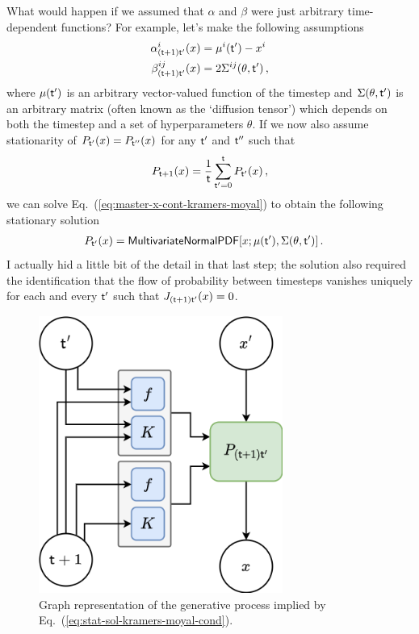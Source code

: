 \documentclass{book}
\begin{document}
What would happen if we assumed that $\alpha$ and $\beta$ were just arbitrary time-dependent functions? For example, let's make the following assumptions
\begin{align}
\alpha^i_{({\sf t}+1){\sf t}'}(x) &= \mu^i({\sf t}')-x^i \\
\beta^{ij}_{({\sf t}+1){\sf t}'}(x) &= 2\Sigma^{ij}(\theta, {\sf t}') \,,
\end{align}
where $\mu ({\sf t}')$ is an arbitrary vector-valued function of the timestep and $\Sigma (\theta ,{\sf t}')$ is an arbitrary matrix (often known as the `diffusion tensor') which depends on both the timestep and a set of hyperparameters $\theta$. If we now also assume stationarity of $P_{{\sf t}'}(x)=P_{{\sf t}''}(x)$ for any ${\sf t}'$ and ${\sf t}''$ such that
\begin{align}
P_{{\sf t}+1}(x) = \frac{1}{{\sf t}}\sum_{{\sf t}'=0}^{{\sf t}} P_{{\sf t}'}(x) \,,
\end{align}
we can solve Eq.~(\ref{eq:master-x-cont-kramers-moyal}) to obtain the following stationary solution
\begin{align}
P_{{\sf t}'}(x) &= {\sf MultivariateNormalPDF}[x;\mu ({\sf t}'),\Sigma (\theta , {\sf t}')]\label{eq:stat-sol-kramers-moyal}\,.
\end{align}
I actually hid a little bit of the detail in that last step; the solution also required the identification that the flow of probability between timesteps vanishes uniquely for each and every ${\sf t}'$ such that $J_{({\sf t}+1){\sf t}'}(x)=0$. 

\begin{figure}[h]
\centering
\includegraphics[width=8cm]{images/gp-like-diag.drawio.png}
\caption{Graph representation of the generative process implied by Eq.~(\ref{eq:stat-sol-kramers-moyal-cond}).}
\label{fig:stat-sol-kramers-moyal-cond}
\end{figure}
\end{document}
